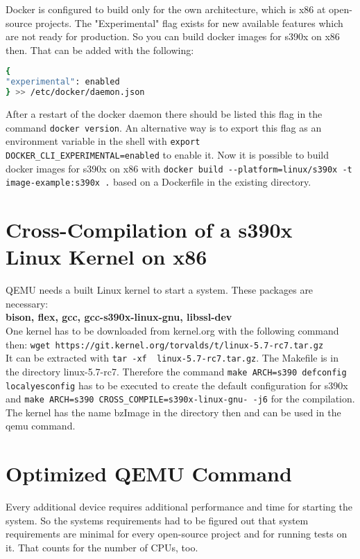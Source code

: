 Docker is configured to build only for the own architecture, which is x86 at open-source projects. The "Experimental" flag exists for new available features which are not ready for production. So you can build docker images for s390x on x86 then. That can be added with the following:

\begin{lstlisting}[language=bash,caption={Docker Experimental Flag},captionpos=b]
{
"experimental": enabled
} >> /etc/docker/daemon.json
\end{lstlisting}

After a restart of the docker daemon there should be listed this flag in the command  \lstinline!docker version!. An alternative way is to export this flag as an environment variable in the shell with  \lstinline!export DOCKER_CLI_EXPERIMENTAL=enabled! to enable it. Now it is possible to build docker images for s390x on x86 with  \lstinline!docker build --platform=linux/s390x -t image-example:s390x .! based on a Dockerfile in the existing directory.

 

 

\section{Cross-Compilation of a s390x Linux Kernel on x86}

QEMU needs a built Linux kernel to start a system. These packages are necessary: \\
\textbf{bison, flex, gcc, gcc-s390x-linux-gnu, libssl-dev} \\
One kernel has to be downloaded from kernel.org with the following command then:  \lstinline!wget https://git.kernel.org/torvalds/t/linux-5.7-rc7.tar.gz!\\
It can be extracted with \lstinline!tar -xf  linux-5.7-rc7.tar.gz!. The Makefile is in the directory linux-5.7-rc7. Therefore the command \lstinline!make ARCH=s390 defconfig localyesconfig! has to be executed to create the default configuration for s390x and  \lstinline!make ARCH=s390 CROSS_COMPILE=s390x-linux-gnu- -j6! for the compilation. The kernel has the name bzImage in the directory  then and can be used in the qemu command.

\section{Optimized QEMU Command}

Every additional device requires additional performance and time for starting the system. 
So the systems requirements had to be figured out that system requirements are minimal for every open-source project and for running tests on it. 
That counts for the number of CPUs, too. \\

